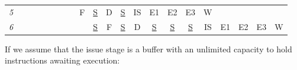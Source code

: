 \begin{table}[H]
{\begin{tabular}{c|cccccccccccccccccccc}
    \textit{5}           &             &             &             &             &             &             &             & F           & \underline{S}     & D            & \underline{S}      & IS           & E1           & E2           & E3           & W            &              &              &              &              \\
    \textit{6}           &             &             &             &             &             &             &             &             & \underline{S}     & F            & \underline{S}      & D            & \underline{S}      & \underline{S}      & \underline{S}      & IS           & E1           & E2           & E3           & W           
    \end{tabular}%
    }
\end{table}
If we assume that the issue stage is a buffer with an unlimited capacity to hold instructions awaiting execution:
